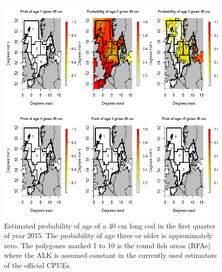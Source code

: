 \documentclass[a4paper 12pt]{article}
\numberwithin{equation}{section}
\begin{document}
\begin{figure}[h!]
\centering
\includegraphics[scale=0.4]{Allcode40cm2015.png}
\caption{Estimated probability of age of a 40 cm long cod in the first quarter of year 2015. The probability of age three or older is approximately zero. The polygones marked 1 to 10 is the round fish areas (RFAs) where the ALK is assumed constant in the currently used estimators of the official CPUEs.}\label{fig:40cmCod2015}
\end{figure}
\end{document}
